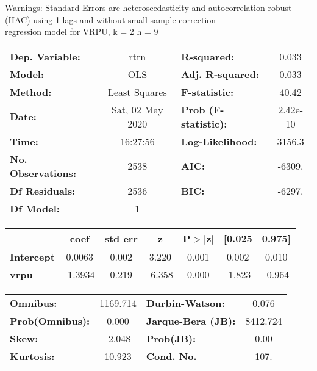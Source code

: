 Warnings: \newline
 [1] Standard Errors are heteroscedasticity and autocorrelation robust (HAC) using 1 lags and without small sample correction\\ 

regression model for VRPU, k = 2 h = 9\begin{center}
\begin{tabular}{lclc}
\toprule
\textbf{Dep. Variable:}    &       rtrn       & \textbf{  R-squared:         } &     0.033   \\
\textbf{Model:}            &       OLS        & \textbf{  Adj. R-squared:    } &     0.033   \\
\textbf{Method:}           &  Least Squares   & \textbf{  F-statistic:       } &     40.42   \\
\textbf{Date:}             & Sat, 02 May 2020 & \textbf{  Prob (F-statistic):} &  2.42e-10   \\
\textbf{Time:}             &     16:27:56     & \textbf{  Log-Likelihood:    } &    3156.3   \\
\textbf{No. Observations:} &        2538      & \textbf{  AIC:               } &    -6309.   \\
\textbf{Df Residuals:}     &        2536      & \textbf{  BIC:               } &    -6297.   \\
\textbf{Df Model:}         &           1      & \textbf{                     } &             \\
\bottomrule
\end{tabular}
\begin{tabular}{lcccccc}
                   & \textbf{coef} & \textbf{std err} & \textbf{z} & \textbf{P$> |$z$|$} & \textbf{[0.025} & \textbf{0.975]}  \\
\midrule
\textbf{Intercept} &       0.0063  &        0.002     &     3.220  &         0.001        &        0.002    &        0.010     \\
\textbf{vrpu}      &      -1.3934  &        0.219     &    -6.358  &         0.000        &       -1.823    &       -0.964     \\
\bottomrule
\end{tabular}
\begin{tabular}{lclc}
\textbf{Omnibus:}       & 1169.714 & \textbf{  Durbin-Watson:     } &    0.076  \\
\textbf{Prob(Omnibus):} &   0.000  & \textbf{  Jarque-Bera (JB):  } & 8412.724  \\
\textbf{Skew:}          &  -2.048  & \textbf{  Prob(JB):          } &     0.00  \\
\textbf{Kurtosis:}      &  10.923  & \textbf{  Cond. No.          } &     107.  \\
\bottomrule
\end{tabular}
\end{center}

